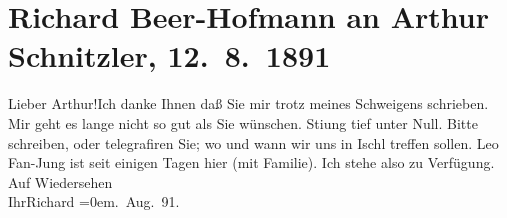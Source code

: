 

         
         \renewcommand{\erwaehntePersonen}{Personen: Richard Beer-Hofmann, Leo Van-Jung}
         \renewcommand{\erwaehnteOrte}{Orte: Bad Aussee, Bad Ischl}
         \renewcommand{\erwaehnteWerke}{}
               \section[Richard Beer-Hofmann an Arthur Schnitzler, 12. 8. 1891]{ Richard Beer-Hofmann an Arthur Schnitzler, 12. 8. 1891}\nopagebreak{}\rehead{ }\begin{ledgroupsized}[t]{13cm}\normalsize\beginnumbering \toendnotes[C]{\smallbreak\pagebreak[2]} 
\pstart
           \noindent{}{\pb}Lieber Arthur!\hspace*{2em}Ich danke Ihnen daß Sie mir trotz meines Schweigens
               schrieben. Mir geht es lange nicht so gut als Sie wünschen. Sti{\geminationm}ung tief unter Null. Bitte schreiben, oder telegrafiren
               Sie; wo und wann wir uns in Ischl treffen sollen.
                  Leo Fan-Jung ist seit einigen Tagen hier (mit Familie). Ich stehe also zu
               Verfügung.\pend
           \pstart
           Auf Wiedersehen{\\[\baselineskip]}Ihr\spacefill\mbox{Richard}\pend
           \leftskip=0em{}. Aug. 91.\pend
           
         
         \endnumbering{}\end{ledgroupsized}  \newcommand{\dateiname}{L00031}\newcommand{\titel}{Richard Beer-Hofmann an Arthur Schnitzler, 12. 8. 1891}\newcommand{\editorInnen}{Martin Anton Müller und Gerd-Hermann Susen}
      